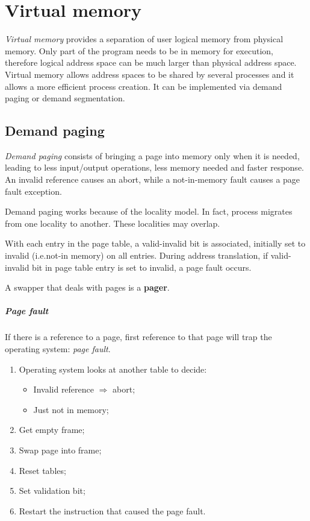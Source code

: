 \chapter{Virtual memory}
\emph{Virtual memory} provides a separation of user logical memory from physical memory. Only part of the program needs to be in memory for execution, therefore logical address space can be much larger than physical address space. Virtual memory allows address spaces to be shared by several processes and it allows a more efficient process creation. It can be implemented via demand paging or demand segmentation.

\section{Demand paging}
\emph{Demand paging} consists of bringing a page into memory only when it is needed, leading to less input/output operations, less memory needed and faster response. An invalid reference causes an abort, while a not-in-memory fault causes a page fault exception.

Demand paging works because of the locality model. In fact, process migrates from one locality to another. These localities may overlap.

With each entry in the page table, a valid-invalid bit is associated, initially set to invalid (i.e.\@ not-in memory) on all entries. During address translation, if valid-invalid bit in page table entry is set to invalid, a page fault occurs.

A swapper that deals with pages is a \textbf{pager}.

\paragraph{Page fault}
If there is a reference to a page, first reference to that page will trap the operating system: \emph{page fault}.
\begin{enumerate}
\item Operating system looks at another table to decide:
\begin{itemize}
\item Invalid reference $\Rightarrow$ abort;
\item Just not in memory;
\end{itemize}
\item Get empty frame;
\item Swap page into frame;
\item Reset tables;
\item Set validation bit;
\item Restart the instruction that caused the page fault.
\end{enumerate}

